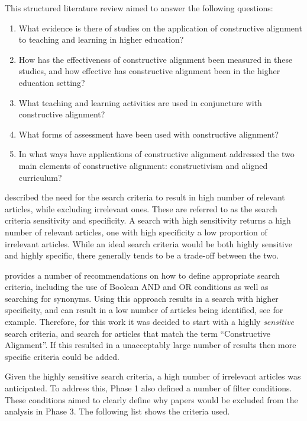 This structured literature review aimed to answer the following questions:

\begin{enumerate}
	\item What evidence is there of studies on the application of constructive alignment to teaching and learning in higher education?
	\item How has the effectiveness of constructive alignment been measured in these studies, and how effective has constructive alignment been in the higher education setting?
	\item What teaching and learning activities are used in conjuncture with constructive alignment?
	\item What forms of assessment have been used with constructive alignment?
	\item In what ways have applications of constructive alignment addressed the two main elements of constructive alignment: constructivism and aligned curriculum?
\end{enumerate}

\citet{Petticrew:2008} described the need for the search criteria to result in high number of relevant articles, while excluding irrelevant ones. These are referred to as the search criteria sensitivity and specificity. A search with high sensitivity returns a high number of relevant articles, one with high specificity a low proportion of irrelevant articles. While an ideal search criteria would be both highly sensitive and highly specific, there generally tends to be a trade-off between the two. 

\citet{Kitchenham:2004} provides a number of recommendations on how to define appropriate search criteria, including the use of Boolean AND and OR conditions as well as searching for synonyms. Using this approach results in a search with higher specificity, and can result in a low number of articles being identified, see \citet{Salleh:2011} for example. Therefore, for this work it was decided to start with a highly \emph{sensitive} search criteria, and search for articles that match the term ``Constructive Alignment''. If this resulted in a unacceptably large number of results then more specific criteria could be added.

Given the highly sensitive search criteria, a high number of irrelevant articles was anticipated. To address this, Phase 1 also defined a number of filter conditions. These conditions aimed to clearly define why papers would be excluded from the analysis in Phase 3. The following list shows the criteria used.

